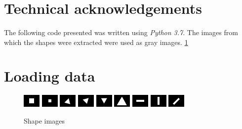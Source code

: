 \section{Technical acknowledgements}
\paragraph{}
The following code presented was written using \emph{Python 3.7}. The images from which the shapes were extracted were used as gray images. \ref{fig:gray-images}

\section{Loading data}
\begin{figure}
    \centering
    \includegraphics[scale=2.0]{rdf-carre-10.png}
    \includegraphics[scale=2.0]{rdf-carre-6.png}
    \includegraphics[scale=2.0]{rdf-triangle-10-15deg.png}
    \includegraphics[scale=2.0]{rdf-triangle-10-45deg.png}
    \includegraphics[scale=2.0]{rdf-triangle-10-60deg.png}
    \includegraphics[scale=2.0]{rdf-triangle-20.png}
    \includegraphics[scale=2.0]{rdf-rectangle-horizontal.png}
    \includegraphics[scale=2.0]{rdf-rectangle-vertical.png}
    \includegraphics[scale=2.0]{rdf-rectangle-diagonal.png}
    \caption{Shape images}
    \label{fig:gray-images}
\end{figure}


